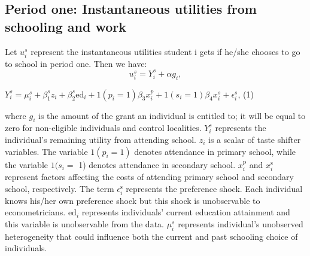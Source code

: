 \documentclass{handoutForSolutions}
\begin{document}
\subsection{Period one: Instantaneous utilities from schooling and work}
Let $u_i^s$ represent the instantaneous utilities student i gets if he/she chooses to go to school in period one. Then we have:
$$
u_{i}^{s}=Y_{i}^{s}+\alpha g_{i},
$$
\begin{center}
$Y_{i}^{s}=\mu_{i}^{s}+\beta_1^{s}z_{i}+\beta_2^{s}\mathrm{e}\mathrm{d}_{i}+1(p_{i}=1)\beta_{3}x_{i}^{p}+1(s_{i}=1)\beta_{4}x_{i}^{s}+\epsilon_{i}^{s}$,   (1)
\end{center}
where $g_{i}$ is the amount of the grant an individual is entitled to; it will be equal to zero for non-eligible individuals and control localities. $Y_{i}^{s}$ represents the individual's remaining utility from attending school. $z_{i}$ is a scalar of taste shifter variables. The variable $1(p_{i}=1)$ denotes attendance in primary school, while the variable $1(s_{i}=$ 1) denotes attendance in secondary school. $x_{i}^{\mathrm{p}}$ and $x_{i}^{\mathrm{s}}$ represent factors affecting the costs of attending primary school and secondary school, respectively. The term $\epsilon_{i}^{\mathrm{s}}$ represents the preference shock. Each individual knows his/her own preference shock but this shock is unobservable to econometricians. $\mathrm{e}\mathrm{d}_{i}$ represents individuals' current education attainment and this variable is unobservable from the data. $\mu_i^s$ represents individual's unobserved heterogeneity that could influence both the current and past schooling choice of individuals.
\end{document}
